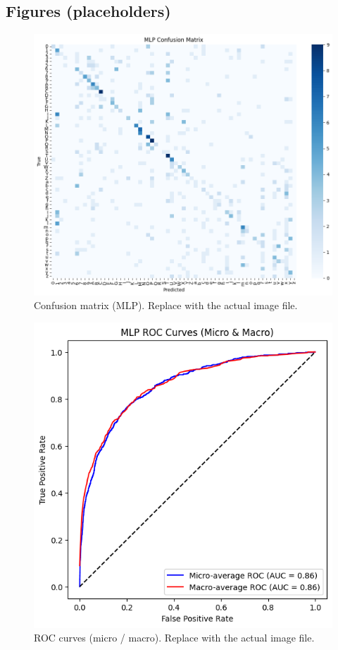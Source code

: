\documentclass[11pt,a4paper]{article}
\begin{document}
\subsection{Figures (placeholders)}
\begin{figure}[H]
  \centering
  \includegraphics[width=0.75\linewidth]{MLP_images/cn_matrix.png}
  \caption{Confusion matrix (MLP). Replace with the actual image file.}
  \label{fig:confmat_mlp}
\end{figure}

\begin{figure}[H]
  \centering
  \includegraphics[width=0.75\linewidth]{MLP_images/roc.png}
  \caption{ROC curves (micro / macro). Replace with the actual image file.}
  \label{fig:roc_mlp}
\end{figure}
\end{document}
